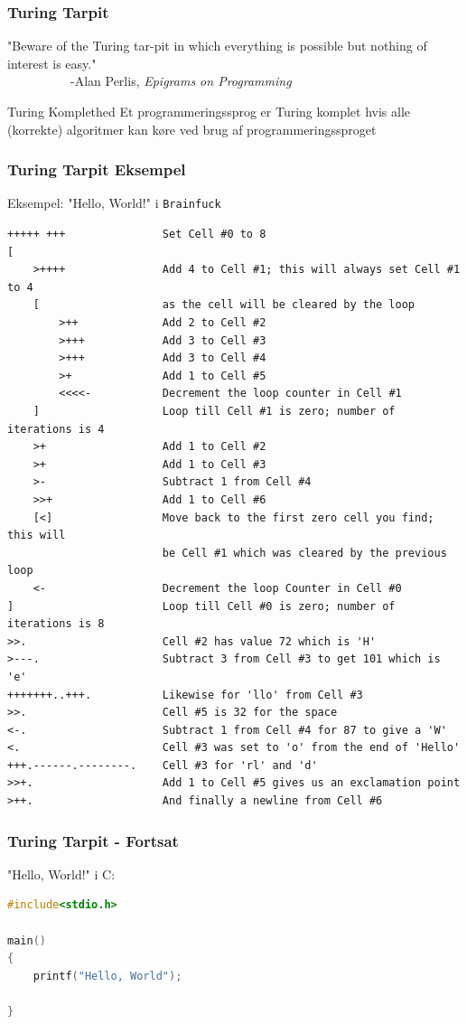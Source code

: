 \documentclass[12pt,t]{beamer}
\begin{document}
\begin{frame}
\frametitle{Turing Tarpit}
"Beware of the Turing tar-pit in which everything is possible but nothing of interest is easy."\\
~~~~~~~~~~-Alan Perlis, \emph{Epigrams on Programming}\\
\begin{block}{Turing Komplethed}
Et programmeringssprog er Turing komplet hvis alle (korrekte) algoritmer kan 
køre ved brug af programmeringssproget
\end{block}
\end{frame}
\begin{frame}[fragile]
\frametitle{Turing Tarpit Eksempel}
Eksempel: "Hello, World!" i \texttt{Brainfuck}\pause
\begin{lstlisting}[basicstyle=\tiny]
+++++ +++               Set Cell #0 to 8
[
    >++++               Add 4 to Cell #1; this will always set Cell #1 to 4
    [                   as the cell will be cleared by the loop
        >++             Add 2 to Cell #2
        >+++            Add 3 to Cell #3
        >+++            Add 3 to Cell #4
        >+              Add 1 to Cell #5
        <<<<-           Decrement the loop counter in Cell #1
    ]                   Loop till Cell #1 is zero; number of iterations is 4
    >+                  Add 1 to Cell #2
    >+                  Add 1 to Cell #3
    >-                  Subtract 1 from Cell #4
    >>+                 Add 1 to Cell #6
    [<]                 Move back to the first zero cell you find; this will
                        be Cell #1 which was cleared by the previous loop
    <-                  Decrement the loop Counter in Cell #0
]                       Loop till Cell #0 is zero; number of iterations is 8
>>.                     Cell #2 has value 72 which is 'H'
>---.                   Subtract 3 from Cell #3 to get 101 which is 'e'
+++++++..+++.           Likewise for 'llo' from Cell #3
>>.                     Cell #5 is 32 for the space
<-.                     Subtract 1 from Cell #4 for 87 to give a 'W'
<.                      Cell #3 was set to 'o' from the end of 'Hello'
+++.------.--------.    Cell #3 for 'rl' and 'd'
>>+.                    Add 1 to Cell #5 gives us an exclamation point
>++.                    And finally a newline from Cell #6
\end{lstlisting}
\end{frame}

\begin{frame}[fragile]
\frametitle{Turing Tarpit - Fortsat}
"Hello, World!" i C:\pause
\begin{lstlisting}[language=C]
#include<stdio.h>

main()
{
    printf("Hello, World");

}
\end{lstlisting}
\end{frame}
\end{document}
